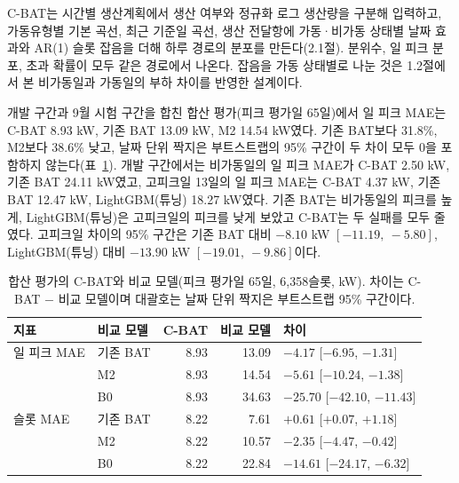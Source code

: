 

C-BAT는 시간별 생산계획에서 생산 여부와 정규화 로그 생산량을 구분해 입력하고, 가동유형별 기본 곡선, 최근 기준일 곡선, 생산 전달항에 가동·비가동 상태별 날짜 효과와 AR(1) 슬롯 잡음을 더해 하루 경로의 분포를 만든다(2.1절). 분위수, 일 피크 분포, 초과 확률이 모두 같은 경로에서 나온다. 잡음을 가동 상태별로 나눈 것은 1.2절에서 본 비가동일과 가동일의 부하 차이를 반영한 설계이다.

개발 구간과 9월 시험 구간을 합친 합산 평가(피크 평가일 65일)에서 일 피크 MAE는 C-BAT 8.93 kW, 기존 BAT 13.09 kW, M2 14.54 kW였다. 기존 BAT보다 31.8\%, M2보다 38.6\% 낮고, 날짜 단위 짝지은 부트스트랩의 95\% 구간이 두 차이 모두 0을 포함하지 않는다(표~\ref{tab:ch5-pooled}). 개발 구간에서는 비가동일의 일 피크 MAE가 C-BAT 2.50 kW, 기존 BAT 24.11 kW였고, 고피크일 13일의 일 피크 MAE는 C-BAT 4.37 kW, 기존 BAT 12.47 kW, LightGBM(튜닝) 18.27 kW였다. 기존 BAT는 비가동일의 피크를 높게, LightGBM(튜닝)은 고피크일의 피크를 낮게 보았고 C-BAT는 두 실패를 모두 줄였다. 고피크일 차이의 95\% 구간은 기존 BAT 대비 $-8.10$ kW $[-11.19,\ -5.80]$, LightGBM(튜닝) 대비 $-13.90$ kW $[-19.01,\ -9.86]$이다.

\begin{table}[htbp]
\centering
\hwptablefont
\setlength{\tabcolsep}{4pt}
\caption{합산 평가의 C-BAT와 비교 모델(피크 평가일 65일, 6,358슬롯, kW). 차이는 C-BAT $-$ 비교 모델이며 대괄호는 날짜 단위 짝지은 부트스트랩 95\% 구간이다.}\label{tab:ch5-pooled}
\begin{tabular}{llrrl}
\toprule
지표 & 비교 모델 & C-BAT & 비교 모델 & 차이 \\
\midrule
일 피크 MAE & 기존 BAT & 8.93 & 13.09 & $-4.17$ [$-6.95$, $-1.31$] \\
 & M2 & 8.93 & 14.54 & $-5.61$ [$-10.24$, $-1.38$] \\
 & B0 & 8.93 & 34.63 & $-25.70$ [$-42.10$, $-11.43$] \\
\midrule
슬롯 MAE & 기존 BAT & 8.22 & 7.61 & $+0.61$ [$+0.07$, $+1.18$] \\
 & M2 & 8.22 & 10.57 & $-2.35$ [$-4.47$, $-0.42$] \\
 & B0 & 8.22 & 22.84 & $-14.61$ [$-24.17$, $-6.32$] \\
\bottomrule
\end{tabular}
\end{table}

